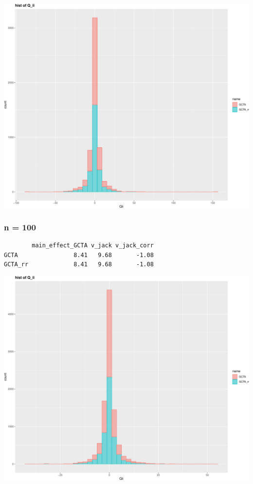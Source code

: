 \documentclass[]{article}
\begin{document}
\includegraphics{GCTA_and_rr_v_jack_correction_files/figure-latex/unnamed-chunk-3-1.pdf}
\newpage

\subsubsection{n = 100}\label{n-100}

\begin{verbatim}
        main_effect_GCTA v_jack v_jack_corr
GCTA                8.41   9.68       -1.08
GCTA_rr             8.41   9.68       -1.08
\end{verbatim}

\includegraphics{GCTA_and_rr_v_jack_correction_files/figure-latex/unnamed-chunk-4-1.pdf}
\newpage
\end{document}
